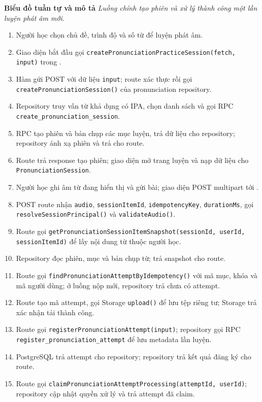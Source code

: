 \documentclass[12pt,a4paper,oneside]{report}
\begin{document}
\noindent\textbf{Biểu đồ tuần tự và mô tả}
\noindent\textit{Luồng chính tạo phiên và xử lý thành công một lần luyện phát âm mới.}
\begin{enumerate}
    \item Người học chọn chủ đề, trình độ và số từ để luyện phát âm.
    \item Giao diện bắt đầu gọi \texttt{createPronunciationPracticeSession(fetch, input)} trong .
    \item Hàm gửi POST  với dữ liệu \texttt{input}; route xác thực rồi gọi \texttt{createPronunciationSession()} của pronunciation repository.
    \item Repository truy vấn từ khả dụng có IPA, chọn danh sách và gọi RPC \texttt{create\_pronunciation\_session}.
    \item RPC tạo phiên và bản chụp các mục luyện, trả dữ liệu cho repository; repository ánh xạ phiên và trả cho route.
    \item Route trả response tạo phiên; giao diện mở trang luyện và nạp dữ liệu cho \texttt{PronunciationSession}.
    \item Người học ghi âm từ đang hiển thị và gửi bài; giao diện POST multipart tới .
    \item POST route nhận \texttt{audio}, \texttt{sessionItemId}, \texttt{idempotencyKey}, \texttt{durationMs}, gọi \texttt{resolveSessionPrincipal()} và \texttt{validateAudio()}.
    \item Route gọi \texttt{getPronunciationSessionItemSnapshot(sessionId, userId, sessionItemId)} để lấy nội dung từ thuộc người học.
    \item Repository đọc phiên, mục và bản chụp từ; trả snapshot cho route.
    \item Route gọi \texttt{findPronunciationAttemptByIdempotency()} với mã mục, khóa và mã người dùng; ở luồng nộp mới, repository trả chưa có attempt.
    \item Route tạo mã attempt, gọi Storage \texttt{upload()} để lưu tệp riêng tư; Storage trả xác nhận tải thành công.
    \item Route gọi \texttt{registerPronunciationAttempt(input)}; repository gọi RPC \texttt{register\_pronunciation\_attempt} để lưu metadata lần luyện.
    \item PostgreSQL trả attempt cho repository; repository trả kết quả đăng ký cho route.
    \item Route gọi \texttt{claimPronunciationAttemptProcessing(attemptId, userId)}; repository cập nhật quyền xử lý và trả attempt đã claim.

\end{enumerate}
\end{document}
